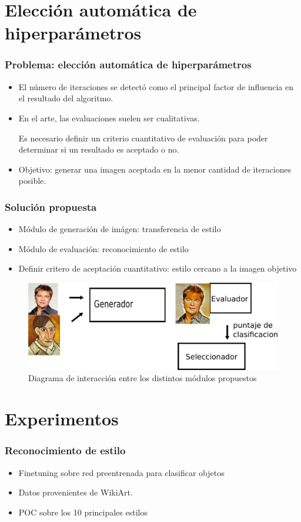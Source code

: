 \documentclass[10pt,center]{beamer}
\newcommand{\subitem}{\par\qquad}
\begin{document}
\section{Elección automática de hiperparámetros}
\begin{frame}
  \frametitle{Problema: elección automática de hiperparámetros}
  \begin{itemize}
   \item El número de iteraciones se detectó como el principal factor de influencia en el resultado del algoritmo.
   \item En el arte, las evaluaciones suelen ser cualitativas.
    \subitem Es necesario definir un criterio cuantitativo de evaluación para poder determinar si un resultado es aceptado o no.
  \item Objetivo: generar una imagen aceptada en la menor cantidad de iteraciones posible.
  \end{itemize}

\end{frame}

\begin{frame}
 \frametitle{Solución propuesta}
  \begin{itemize}
   \item Módulo de generación de imágen: transferencia de estilo
   \item Módulo de evaluación: reconocimiento de estilo
   \item Definir critero de aceptación cuantitativo: estilo cercano a la imagen objetivo 
  \end{itemize}
  \begin{figure}[h]
    \begin{center}
      \includegraphics[width=\linewidth]{./img/diagrama.png}
    \end{center}
    \caption{Diagrama de interacción entre los distintos módulos propuestos}
  \end{figure}
\end{frame}

\section{Experimentos}
\begin{frame}
  \frametitle{Reconocimiento de estilo}
  \begin{itemize}
    \item Finetuning sobre red preentrenada para clasificar objetos
    \item Datos provenientes de WikiArt.
    \item POC sobre los 10 principales estilos
  \end{itemize}
\end{frame}
\end{document}
